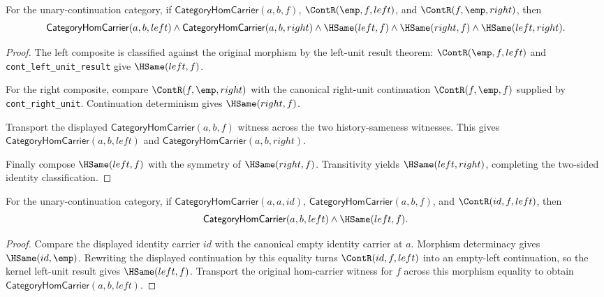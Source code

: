 \begin{theorem}
\label{thm:category-hom-carrier-two-sided-identity-law}
For the unary-continuation category, if
$\mathsf{CategoryHomCarrier}(a,b,f)$, $\ContR(\emp,f,left)$, and
$\ContR(f,\emp,right)$, then
$$
\mathsf{CategoryHomCarrier}(a,b,left)\wedge
\mathsf{CategoryHomCarrier}(a,b,right)\wedge
\HSame(left,f)\wedge\HSame(right,f)\wedge\HSame(left,right).
$$
\end{theorem}
\begin{proof}
The left composite is classified against the original morphism by the
left-unit result theorem: $\ContR(\emp,f,left)$ and
\texttt{cont\_left\_unit\_result} give $\HSame(left,f)$.

For the right composite, compare $\ContR(f,\emp,right)$ with the canonical
right-unit continuation $\ContR(f,\emp,f)$ supplied by
\texttt{cont\_right\_unit}. Continuation determinism gives
$\HSame(right,f)$.

Transport the displayed $\mathsf{CategoryHomCarrier}(a,b,f)$ witness across
the two history-sameness witnesses. This gives
$\mathsf{CategoryHomCarrier}(a,b,left)$ and
$\mathsf{CategoryHomCarrier}(a,b,right)$.

Finally compose $\HSame(left,f)$ with the symmetry of $\HSame(right,f)$.
Transitivity yields $\HSame(left,right)$, completing the two-sided identity
classification.
\end{proof}

\begin{theorem}
\label{thm:category-hom-carrier-left-identity-carrier-result}
For the unary-continuation category, if
$\mathsf{CategoryHomCarrier}(a,a,id)$,
$\mathsf{CategoryHomCarrier}(a,b,f)$, and $\ContR(id,f,left)$, then
$$
\mathsf{CategoryHomCarrier}(a,b,left)\wedge\HSame(left,f).
$$
\end{theorem}
\begin{proof}
Compare the displayed identity carrier $id$ with the canonical empty identity
carrier at $a$. Morphism determinacy gives $\HSame(id,\emp)$. Rewriting the
displayed continuation by this equality turns $\ContR(id,f,left)$ into an
empty-left continuation, so the kernel left-unit result gives
$\HSame(left,f)$. Transport the original hom-carrier witness for $f$ across
this morphism equality to obtain $\mathsf{CategoryHomCarrier}(a,b,left)$.
\end{proof}

